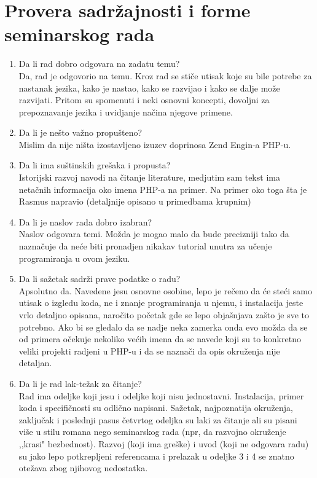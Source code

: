 \documentclass[a4paper]{report}
\begin{document}
\section{Provera sadržajnosti i forme seminarskog rada}

\begin{enumerate}
\item Da li rad dobro odgovara na zadatu temu?\\
Da, rad je odgovorio na temu. Kroz rad se stiče utisak koje su bile potrebe za nastanak jezika, kako je nastao, kako se razvijao i kako se dalje može razvijati. Pritom su spomenuti i neki osnovni koncepti, dovoljni za prepoznavanje jezika i uvidjanje načina njegove primene.
\item Da li je nešto važno propušteno? \\
Mislim da nije ništa izostavljeno izuzev doprinosa Zend Engin-a PHP-u.
\item Da li ima suštinskih grešaka i propusta?\\
Istorijski razvoj navodi na čitanje literature, medjutim sam tekst ima netačnih informacija oko imena PHP-a na primer. Na primer oko toga šta je Rasmus napravio (detaljnije opisano u primedbama krupnim)
\item Da li je naslov rada dobro izabran?\\
Naslov odgovara temi. Možda je mogao malo da bude precizniji tako da naznačuje da neće biti pronadjen nikakav tutorial unutra za učenje programiranja u ovom jeziku.
\item Da li sažetak sadrži prave podatke o radu?\\
Apsolutno da. Navedene jesu osnovne osobine, lepo je rečeno da će steći samo utisak o izgledu koda, ne i znanje programiranja u njemu, i instalacija jeste vrlo detaljno opisana, naročito početak gde se lepo objašnjava zašto je sve to potrebno. Ako bi se gledalo da se nadje neka zamerka onda evo možda da se od primera očekuje nekoliko većih imena da se navede koji su to konkretno veliki projekti radjeni u PHP-u i da se naznači da opis okruženja nije detaljan.
\item Da li je rad lak-težak za čitanje?\\
Rad ima odeljke koji jesu i odeljke koji nisu jednostavni. Instalacija, primer koda i specifičnosti su odlično napisani. Sažetak, najpoznatija okruženja, zaključak i poslednji pasus četvrtog odeljka su laki za čitanje ali su pisani više u stilu romana nego seminarskog rada (npr, da razvojno okruženje ,,krasi" bezbednost). Razvoj (koji ima greške) i uvod (koji ne odgovara radu) su jako lepo potkrepljeni referencama i prelazak u odeljke 3 i 4 se znatno otežava zbog njihovog nedostatka. 

\end{enumerate}
\end{document}

